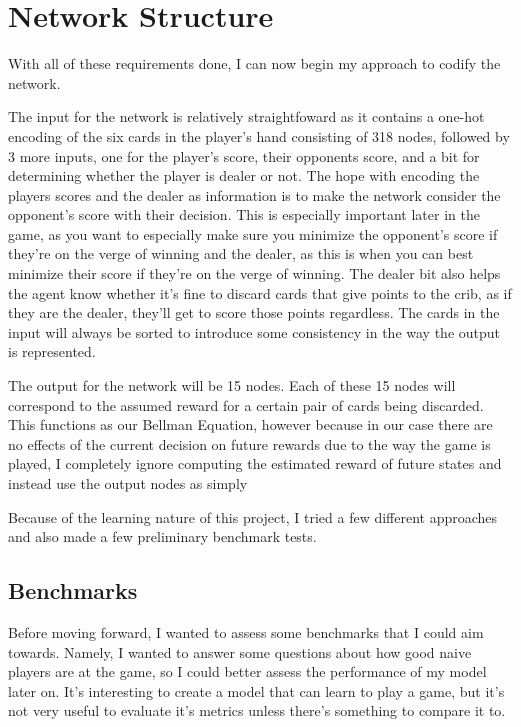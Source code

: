 \documentclass[]{article}
\begin{document}
\section{Network Structure}

With all of these requirements done, I can now begin my approach to codify the network. 

The input for the network is relatively straightfoward as it contains a one-hot encoding of the six cards in the player's hand consisting of 318 nodes, followed by 3 more inputs, one for the player's score, their opponents score, and a bit for determining whether the player is dealer or not. The hope with encoding the players scores and the dealer as information is to make the network consider the opponent's score with their decision. This is especially important later in the game, as you want to especially make sure you minimize the opponent's score if they're on the verge of winning and the dealer, as this is when you can best minimize their score if they're on the verge of winning. The dealer bit also helps the agent know whether it's fine to discard cards that give points to the crib, as if they are the dealer, they'll get to score those points regardless. The cards in the input will always be sorted to introduce some consistency in the way the output is represented. 

The output for the network will be 15 nodes. Each of these 15 nodes will correspond to the assumed reward for a certain pair of cards being discarded. This functions as our Bellman Equation, however because in our case there are no effects of the current decision on future rewards due to the way the game is played, I completely ignore computing the estimated reward of future states and instead use the output nodes as simply 

Because of the learning nature of this project, I tried a few different approaches and also made a few preliminary benchmark tests.

\subsection{Benchmarks}

Before moving forward, I wanted to assess some benchmarks that I could aim towards. Namely, I wanted to answer some questions about how good naive players are at the game, so I could better assess the performance of my model later on. It's interesting to create a model that can learn to play a game, but it's not very useful to evaluate it's metrics unless there's something to compare it to. 
\end{document}

